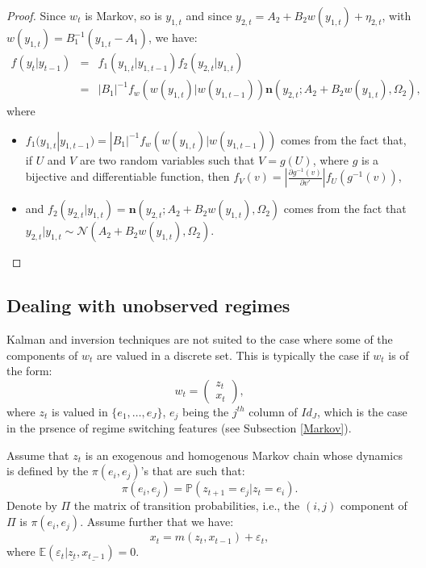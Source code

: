 \documentclass[
  12pt,
]{book}
\providecommand{\tightlist}{%
  \setlength{\itemsep}{0pt}\setlength{\parskip}{0pt}}
\theoremstyle{definition}
\theoremstyle{definition}
\theoremstyle{definition}
\theoremstyle{definition}
\theoremstyle{remark}
\begin{document}
\begin{proof}

Since \(w_t\) is Markov, so is \(y_{1,t}\) and since \(y_{2,t} = A_2 + B_2 w(y_{1,t}) + \eta_{2,t}\), with \(w(y_{1,t}) = B_{1}^{-1}(y_{1,t} - A_1)\), we have:
\begin{eqnarray*}
f(y_t|y_{t-1}) &=& f_1(y_{1,t}|y_{1,t-1}) f_2(y_{2,t}|y_{1,t}) \\
&=& |B_1|^{-1} f_w(w(y_{1,t})|w(y_{1,t-1})) \mathbf{n}(y_{2,t}; A_2 + B_2w(y_{1,t}),\Omega_2),
\end{eqnarray*}
where

\begin{itemize}
\tightlist
\item
  \(f_1(y_{1,t}|y_{1,t-1})= |B_1|^{-1} f_w(w(y_{1,t})|w(y_{1,t-1}))\) comes from the fact that, if \(U\) and \(V\) are two random variables such that \(V = g(U)\), where \(g\) is a bijective and differentiable function, then \(f_V(v)=\left|\frac{\partial g^{-1}(v)}{\partial v'}\right| f_U(g^{-1}(v))\),
\item
  and \(f_2(y_{2,t}|y_{1,t}) = \mathbf{n}(y_{2,t}; A_2 + B_2w(y_{1,t}),\Omega_2)\) comes from the fact that \(y_{2,t}|y_{1,t} \sim \mathcal{N}(A_2 + B_2 w(y_{1,t}),\Omega_2)\).
\end{itemize}

\end{proof}

\hypertarget{EstimationRS}{%
\subsection{Dealing with unobserved regimes}\label{EstimationRS}}

Kalman and inversion techniques are not suited to the case where some of the components of \(w_t\) are valued in a discrete set. This is typically the case if \(w_t\) is of the form:
\[
w_t = \left(\begin{array}{c}
z_t \\
x_t
\end{array}\right),
\]
where \(z_t\) is valued in \(\{e_1,\dots,e_J\}\), \(e_j\) being the \(j^{th}\) column of \(Id_J\), which is the case in the prsence of regime switching features (see Subsection \ref{Markov}).

Assume that \(z_t\) is an exogenous and homogenous Markov chain whose dynamics is defined by the \(\pi(e_i,e_j)\)'s that are such that:
\begin{equation}
\pi(e_i, e_j) = \mathbb{P}(z_{t+1}=e_j | z_t=e_i).\label{eq:transitproba}
\end{equation}
Denote by \(\Pi\) the matrix of transition probabilities, i.e., the \((i,j)\) component of \(\Pi\) is \(\pi(e_i, e_j)\). Assume further that we have:
\begin{equation}
x_t = m(z_t,x_{t-1}) + \varepsilon_t,\label{eq:dynxRS}
\end{equation}
where \(\mathbb{E}(\varepsilon_t|\underline{z_t},\underline{x_{t-1}})=0\).
\end{document}
